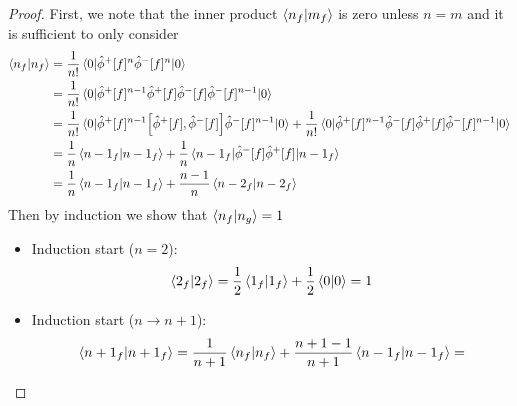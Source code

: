 \qkgnumberinnerproduct
\begin{proof}
	First, we note that the inner product $\braket{n_f}{m_f}$ is zero unless $n=m$ and it is sufficient to only consider
	\begin{equation*}
		\begin{split}
			\braket{n_f}{n_f}
			&=
			\frac{1}{n!}
			\expval{
				\hat\phi^+[f]^n
				\hat\phi^-[f]^n
			}{0}
			\\
			&=
			\frac{1}{n!}
			\expval{
				\hat\phi^+[f]^{n-1}
				\hat\phi^+[f]
				\hat\phi^-[f]
				\hat\phi^-[f]^{n-1}
			}{0}
			\\
			&=
			\frac{1}{n!}
			\expval{
				\hat\phi^+[f]^{n-1}
				\comm{\hat\phi^+[f]}{\hat\phi^-[f]}
				\hat\phi^-[f]^{n-1}
			}{0}
			+
			\frac{1}{n!}
			\expval{
				\hat\phi^+[f]^{n-1}
				\hat\phi^-[f]
				\hat\phi^+[f]
				\hat\phi^-[f]^{n-1}
			}{0}
			\\
			&=
			\frac{1}{n}
			\braket{n-1_f}
			+
			\frac{1}{n}
			\expval{
				\hat\phi^-[f]
				\hat\phi^+[f]
			}{n-1_f}
			\\
			&=
			\frac{1}{n}
			\braket{n-1_f}
			+
			\frac{n-1}{n}
			\braket{n-2_f}
		\end{split}
	\end{equation*}
	Then by induction we show that $\braket{n_f}{n_g}=1$
	\begin{itemize}
		\item Induction start ($n=2$):
		\begin{equation*}
			\braket{2_f}
			=
			\frac{1}{2}
			\braket{1_f}
			+
			\frac{1}{2}
			\braket{0}
			=
			1
		\end{equation*}
		\item Induction start ($n\to n+1$):
		\begin{equation*}
			\begin{split}
				\braket{n+1_f}
				=
				\frac{1}{n+1}
				\braket{n_f}
				+
				\frac{n+1-1}{n+1}
				\braket{n-1_f}
				=
			\end{split}
		\end{equation*}
	\end{itemize}
\end{proof}

